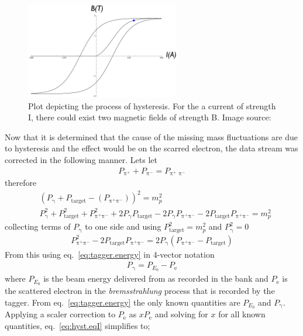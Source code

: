 \begin{figure}\begin{center}
\includegraphics[width=0.6\textwidth]{figures/calib/tag/ecor/hysteresis_keynote.eps}
\caption[Plot Depicting the Process of Hysteresis]{\label{fig:hyst}Plot depicting the process of hysteresis. For the a current of strength I, there could exist two magnetic fields of strength B. Image source:~\cite{clas.thesis.kunkel}}
\end{center}\end{figure}
\FloatBarrier
Now that it is determined that the cause of the  missing mass fluctuations are due to hysteresis and the effect would be on the scarred electron, the  data stream was corrected in the following manner. Lets let
\begin{align}
P_\text{π$^+$} + P_\text{π$^-$} = P_\text{π$^+$ π$^-$} \nonumber
\end{align}
therefore
\begin{align}
&(P_\text{γ} + P_\mathrm{target} - (P_\text{π$^+$π$^-$}))^2 = m_p^2 \\
& P_\text{γ}^2 + P_\mathrm{target}^2 + P_\text{π$^+$π$^-$}^2 + 2P_\text{γ}P_\mathrm{target} - 2P_\text{γ}P_\text{π$^+$π$^-$} - 2P_\mathrm{target}P_\text{π$^+$π$^-$}= m_p^2
\label{eq:tagger.energy}
\end{align}
collecting terms of $P_\text{γ}$ to one side and using $P_\mathrm{target}^2 = m_p^2 $ and $P_\text{γ}^2 = 0$
\begin{align}\label{eq:hyst.eqI}
 P_\text{π$^+$π$^-$}^2 - 2P_\mathrm{target}P_\text{π$^+$π$^-$}= 2P_\text{γ}(P_\text{π$^+$π$^-$} - P_\mathrm{target})
\end{align}
From this using eq.~\ref{eq:tagger.energy} in 4-vector notation
\begin{align}\label{eq:tagger.energyII}
P_\text{γ} = P_{E_0} - P_\text{e}\nonumber
\end{align}
where $P_{E_0}$ is the beam energy delivered from  as recorded in the  bank and $P_\text{e}$ is the scattered electron in the \emph{bremsstrahlung} process that is recorded by the tagger. From eq.~\ref{eq:tagger.energy} the only known quantities are $P_{E_0}$ and $P_\text{γ}$. Applying a scaler correction to $P_\text{e}$ as $xP_\text{e}$ and solving for $x$ for all known quantities, eq.~\ref{eq:hyst.eqI} simplifies to;
